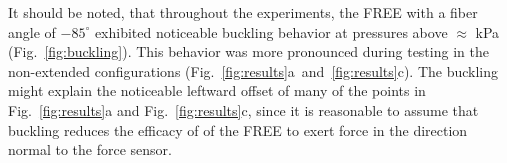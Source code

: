 
It should be noted, that throughout the experiments, the FREE with a fiber angle of $-85^\circ$ exhibited noticeable buckling behavior at pressures above $\approx$ \unit[50]{kPa} (Fig.~\ref{fig:buckling}). 
This behavior was more pronounced during testing in the non-extended configurations (Fig.~\ref{fig:results}a~and~\ref{fig:results}c). 
The buckling might explain the noticeable leftward offset of many of the points in Fig.~\ref{fig:results}a and Fig.~\ref{fig:results}c, since it is reasonable to assume that buckling reduces the efficacy of of the FREE to exert force in the direction normal to the force sensor. 

